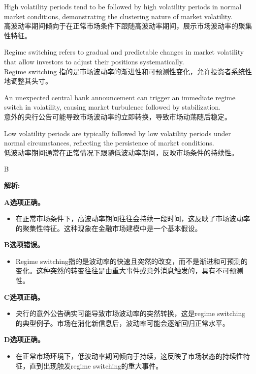 \documentclass{article}
\newenvironment{explanation}
{\textbf{解析:}\par}
{\par}
\begin{document}
\begin{choices}
    \item High volatility periods tend to be followed by high volatility periods in normal market conditions, demonstrating the clustering nature of market volatility. \\
    高波动率期间倾向于在正常市场条件下跟随高波动率期间，展示市场波动率的聚集性特征。
    
    \item Regime switching refers to gradual and predictable changes in market volatility that allow investors to adjust their positions systematically. \\
    Regime switching 指的是市场波动率的渐进性和可预测性变化，允许投资者系统性地调整其头寸。
    
    \item An unexpected central bank announcement can trigger an immediate regime switch in volatility, causing market turbulence followed by stabilization. \\
    意外的央行公告可能导致市场波动率的立即转换，导致市场动荡随后稳定。
    
    \item Low volatility periods are typically followed by low volatility periods under normal circumstances, reflecting the persistence of market conditions. \\
    低波动率期间通常在正常情况下跟随低波动率期间，反映市场条件的持续性。
\end{choices}

\begin{correctanswer}
    B
\end{correctanswer}

\begin{explanation}
    \textbf{A选项正确。}
    \begin{itemize}
        \item 在正常市场条件下，高波动率期间往往会持续一段时间，这反映了市场波动率的聚集性特征。这种现象在金融市场建模中是一个基本假设。
    \end{itemize}

    \textbf{B选项错误。}
    \begin{itemize}
        \item Regime switching指的是波动率的快速且突然的改变，而不是渐进和可预测的变化。这种突然的转变往往是由重大事件或意外消息触发的，具有不可预测性。
    \end{itemize}

    \textbf{C选项正确。}
    \begin{itemize}
        \item 央行的意外公告确实可能导致市场波动率的突然转换，这是regime switching的典型例子。市场在消化新信息后，波动率可能会逐渐回归正常水平。
    \end{itemize}

    \textbf{D选项正确。}
    \begin{itemize}
        \item 在正常市场环境下，低波动率期间倾向于持续，这反映了市场状态的持续性特征，直到出现触发regime switching的重大事件。
    \end{itemize}
\end{explanation}
\end{document}
